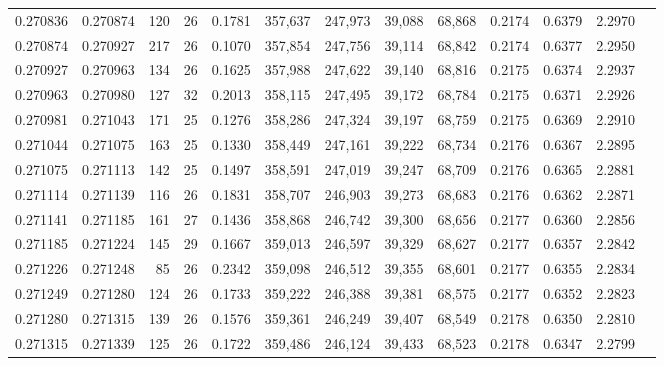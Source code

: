 \begin{tabular}{rrrrrrrrrrrrr}
0.270836 & 0.270874 &   120 &  26 &                                     0.1781 & 357,637 & 247,973 &  39,088 &  68,868 & 0.2174 & 0.6379 & 2.2970 \\
0.270874 & 0.270927 &   217 &  26 &                                     0.1070 & 357,854 & 247,756 &  39,114 &  68,842 & 0.2174 & 0.6377 & 2.2950 \\
0.270927 & 0.270963 &   134 &  26 &                                     0.1625 & 357,988 & 247,622 &  39,140 &  68,816 & 0.2175 & 0.6374 & 2.2937 \\
0.270963 & 0.270980 &   127 &  32 &                                     0.2013 & 358,115 & 247,495 &  39,172 &  68,784 & 0.2175 & 0.6371 & 2.2926 \\
0.270981 & 0.271043 &   171 &  25 &                                     0.1276 & 358,286 & 247,324 &  39,197 &  68,759 & 0.2175 & 0.6369 & 2.2910 \\
0.271044 & 0.271075 &   163 &  25 &                                     0.1330 & 358,449 & 247,161 &  39,222 &  68,734 & 0.2176 & 0.6367 & 2.2895 \\
0.271075 & 0.271113 &   142 &  25 &                                     0.1497 & 358,591 & 247,019 &  39,247 &  68,709 & 0.2176 & 0.6365 & 2.2881 \\
0.271114 & 0.271139 &   116 &  26 &                                     0.1831 & 358,707 & 246,903 &  39,273 &  68,683 & 0.2176 & 0.6362 & 2.2871 \\
0.271141 & 0.271185 &   161 &  27 &                                     0.1436 & 358,868 & 246,742 &  39,300 &  68,656 & 0.2177 & 0.6360 & 2.2856 \\
0.271185 & 0.271224 &   145 &  29 &                                     0.1667 & 359,013 & 246,597 &  39,329 &  68,627 & 0.2177 & 0.6357 & 2.2842 \\
0.271226 & 0.271248 &    85 &  26 &                                     0.2342 & 359,098 & 246,512 &  39,355 &  68,601 & 0.2177 & 0.6355 & 2.2834 \\
0.271249 & 0.271280 &   124 &  26 &                                     0.1733 & 359,222 & 246,388 &  39,381 &  68,575 & 0.2177 & 0.6352 & 2.2823 \\
0.271280 & 0.271315 &   139 &  26 &                                     0.1576 & 359,361 & 246,249 &  39,407 &  68,549 & 0.2178 & 0.6350 & 2.2810 \\
0.271315 & 0.271339 &   125 &  26 &                                     0.1722 & 359,486 & 246,124 &  39,433 &  68,523 & 0.2178 & 0.6347 & 2.2799 \\

\end{tabular}
